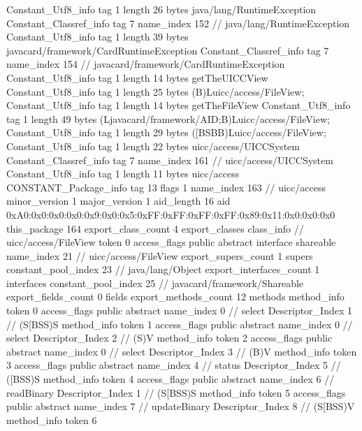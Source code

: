 {{{		}
		Constant_Utf8_info {
			tag	1
			length	26
			bytes	java/lang/RuntimeException
		}
		Constant_Classref_info {
			tag	7
			name_index	152		// java/lang/RuntimeException
		}
		Constant_Utf8_info {
			tag	1
			length	39
			bytes	javacard/framework/CardRuntimeException
		}
		Constant_Classref_info {
			tag	7
			name_index	154		// javacard/framework/CardRuntimeException
		}
		Constant_Utf8_info {
			tag	1
			length	14
			bytes	getTheUICCView
		}
		Constant_Utf8_info {
			tag	1
			length	25
			bytes	(B)Luicc/access/FileView;
		}
		Constant_Utf8_info {
			tag	1
			length	14
			bytes	getTheFileView
		}
		Constant_Utf8_info {
			tag	1
			length	49
			bytes	(Ljavacard/framework/AID;B)Luicc/access/FileView;
		}
		Constant_Utf8_info {
			tag	1
			length	29
			bytes	([BSBB)Luicc/access/FileView;
		}
		Constant_Utf8_info {
			tag	1
			length	22
			bytes	uicc/access/UICCSystem
		}
		Constant_Classref_info {
			tag	7
			name_index	161		// uicc/access/UICCSystem
		}
		Constant_Utf8_info {
			tag	1
			length	11
			bytes	uicc/access
		}
		CONSTANT_Package_info {
			tag	13
			flags	1
			name_index	163		// uicc/access
			minor_version	1
			major_version	1
			aid_length	16
			aid	0xA0:0x0:0x0:0x0:0x9:0x0:0x5:0xFF:0xFF:0xFF:0xFF:0x89:0x11:0x0:0x0:0x0
		}
	}
	this_package	164
	export_class_count	4
	export_classes {
		class_info {		// uicc/access/FileView
			token	0
			access_flags	public abstract interface shareable
			name_index	21		// uicc/access/FileView
			export_supers_count	1
			supers {
				constant_pool_index	23		// java/lang/Object
			}
			export_interfaces_count	1
			interfaces {
				constant_pool_index	25		// javacard/framework/Shareable
			}
			export_fields_count	0
			fields {
			}
			export_methods_count	12
			methods {
				method_info {
					token	0
					access_flags	public abstract
					name_index	0		// select
					Descriptor_Index	1		// (S[BSS)S
				}
				method_info {
					token	1
					access_flags	public abstract
					name_index	0		// select
					Descriptor_Index	2		// (S)V
				}
				method_info {
					token	2
					access_flags	public abstract
					name_index	0		// select
					Descriptor_Index	3		// (B)V
				}
				method_info {
					token	3
					access_flags	public abstract
					name_index	4		// status
					Descriptor_Index	5		// ([BSS)S
				}
				method_info {
					token	4
					access_flags	public abstract
					name_index	6		// readBinary
					Descriptor_Index	1		// (S[BSS)S
				}
				method_info {
					token	5
					access_flags	public abstract
					name_index	7		// updateBinary
					Descriptor_Index	8		// (S[BSS)V
				}
				method_info {
					token	6
}}}}}
